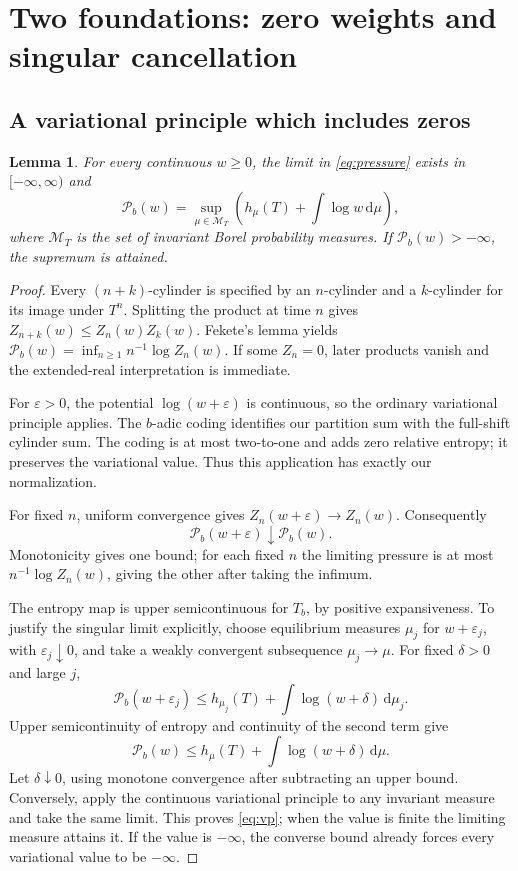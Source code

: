 \documentclass[11pt,a4paper]{article}
\numberwithin{equation}{section}
\newtheorem{lemma}[lemma]{Lemma}\aliascntresetthe{lemma}
\theoremstyle{definition}
\theoremstyle{remark}
\newcommand{\dd}{\,\mathrm d}
\newcommand{\cM}{\mathcal M}
\newcommand{\PP}{\mathcal P}
\begin{document}
\section{Two foundations: zero weights and singular cancellation}
\label{sec:variational}
\subsection{A variational principle which includes zeros}
\begin{lemma}
\label{lem:variational}
For every continuous $w\ge0$, the limit in \cref{eq:pressure} exists in
$[-\infty,\infty)$ and
\begin{equation}
 \PP_b(w)=\sup_{\mu\in\cM_T}
      \left(h_\mu(T)+\int\log w\dd\mu\right),
 \label{eq:vp}
\end{equation}
where $\cM_T$ is the set of invariant Borel probability measures.
If $\PP_b(w)>-\infty$, the supremum is attained.
\end{lemma}
\begin{proof}
Every $(n+k)$-cylinder is specified by an $n$-cylinder and a $k$-cylinder
for its image under $T^n$. Splitting the product at time $n$ gives
$Z_{n+k}(w)\le Z_n(w)Z_k(w)$. Fekete's lemma yields
$\PP_b(w)=\inf_{n\ge1}n^{-1}\log Z_n(w)$. If some $Z_n=0$,
later products vanish and the extended-real interpretation is immediate.

For $\varepsilon>0$, the potential $\log(w+\varepsilon)$ is continuous,
so the ordinary variational principle \cite{Walters} applies. The
$b$-adic coding identifies our partition sum with the full-shift cylinder
sum. The coding is at most two-to-one and adds zero relative entropy;
it preserves the variational value. Thus this application has exactly
our normalization.

For fixed $n$, uniform convergence gives
$Z_n(w+\varepsilon)\to Z_n(w)$. Consequently
\begin{equation}
 \PP_b(w+\varepsilon)\downarrow\PP_b(w).
 \label{eq:pressure-monotone}
\end{equation}
Monotonicity gives one bound; for each fixed $n$ the limiting pressure
is at most $n^{-1}\log Z_n(w)$, giving the other after taking the infimum.

The entropy map is upper semicontinuous for $T_b$, by positive
expansiveness. To justify the singular limit explicitly, choose
equilibrium measures $\mu_j$ for $w+\varepsilon_j$, with
$\varepsilon_j\downarrow0$, and take a weakly convergent subsequence
$\mu_j\to\mu$. For fixed $\delta>0$ and large $j$,
\[
 \PP_b(w+\varepsilon_j)
 \le h_{\mu_j}(T)+\int\log(w+\delta)\dd\mu_j.
\]
Upper semicontinuity of entropy and continuity of the second term give
\[
 \PP_b(w)\le h_\mu(T)+\int\log(w+\delta)\dd\mu.
\]
Let $\delta\downarrow0$, using monotone convergence after subtracting
an upper bound. Conversely, apply the continuous variational principle
to any invariant measure and take the same limit. This proves
\cref{eq:vp}; when the value is finite the limiting measure attains it.
If the value is $-\infty$, the converse bound already forces every
variational value to be $-\infty$.
\end{proof}
\end{document}

